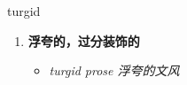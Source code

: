 
\begin{frame}
{\huge turgid}
\begin{center}
\begin{enumerate}\Large
  \item \textbf{浮夸的，过分装饰的}
  \begin{itemize}
    \item \em{\Large{turgid prose 浮夸的文风}}
  \end{itemize}
\end{enumerate}
\end{center}
\end{frame}
